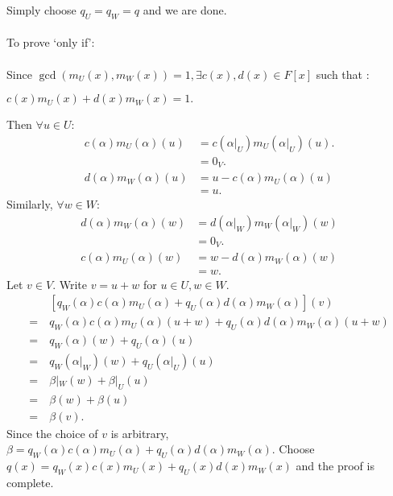 \documentclass{article}
\begin{document}
Simply choose $q_U = q_W = q$ and we are done.\\\\
To prove `only if':\\\\
Since $\gcd(m_U(x),m_W(x)) = 1, \exists c(x),d(x) \in F[x]$ such that :\begin{center}
    $c(x)m_U(x) + d(x)m_W(x) = 1.$
\end{center}
Then $\forall u\in U:$\begin{align*}
c(\alpha)m_U(\alpha)(u) &= c(\alpha|_U)m_U(\alpha|_U)(u).\\ &= 0_V.\\
d(\alpha)m_W(\alpha)(u) &= u - c(\alpha)m_U(\alpha)(u)\\ &= u.
\end{align*}
Similarly, $\forall w\in W:$\begin{align*}
d(\alpha)m_W(\alpha)(w) &= d(\alpha|_W)m_W(\alpha|_W)(w)\\ &= 0_V.\\
c(\alpha)m_U(\alpha)(w) &= w - d(\alpha)m_W(\alpha)(w)\\ &= w.
\end{align*}
Let $v \in V.$ Write $v = u + w$ for $u\in U, w\in W.$\begin{align*}
    &[q_W(\alpha)c(\alpha)m_U(\alpha) + q_U(\alpha)d(\alpha)m_W(\alpha)](v) \\
    =\ &q_W(\alpha)c(\alpha)m_U(\alpha)(u+w) + q_U(\alpha)d(\alpha)m_W(\alpha)(u+w)\\=\ &q_W(\alpha)(w) +q_U(\alpha)(u)\\
    =\ &q_W(\alpha|_W)(w) +q_U(\alpha|_U)(u)\\=\ &\beta|_W(w) + \beta|_U(u)\\
    =\ &\beta(w) + \beta(u)\\
    =\ &\beta(v).
\end{align*}
Since the choice of $v$ is arbitrary, $\beta = q_W(\alpha)c(\alpha)m_U(\alpha) + q_U(\alpha)d(\alpha)m_W(\alpha)$. Choose $q(x) = q_W(x)c(x)m_U(x) + q_U(x)d(x)m_W(x)$ and the proof is complete.
\end{document}
